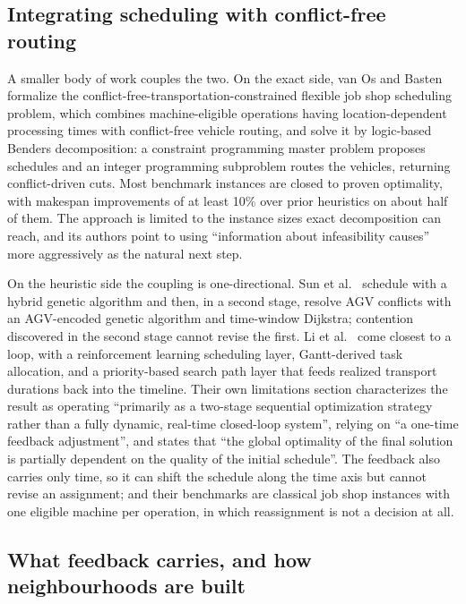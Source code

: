 \documentclass[manuscript,screen,review]{acmart}
\begin{document}
\subsection{Integrating scheduling with conflict-free routing}

A smaller body of work couples the two. On the exact side, van Os and
Basten~\cite{vanos2026exact} formalize the
conflict-free-transportation-constrained flexible job shop scheduling problem,
which combines machine-eligible operations having location-dependent processing
times with conflict-free vehicle routing, and solve it by logic-based Benders
decomposition: a constraint programming master problem proposes schedules and an
integer programming subproblem routes the vehicles, returning conflict-driven
cuts. Most benchmark instances are closed to proven optimality, with makespan
improvements of at least 10\% over prior heuristics on about half of them. The
approach is limited to the instance sizes exact decomposition can reach, and its
authors point to using ``information about infeasibility causes'' more
aggressively as the natural next step.

On the heuristic side the coupling is one-directional. Sun et
al.~\cite{sun2023integrated} schedule with a hybrid genetic algorithm and then,
in a second stage, resolve AGV conflicts with an AGV-encoded genetic algorithm
and time-window Dijkstra; contention discovered in the second stage cannot revise
the first. Li et al.~\cite{li2026framework} come closest to a loop, with a
reinforcement learning scheduling layer, Gantt-derived task allocation, and a
priority-based search path layer that feeds realized transport durations back
into the timeline. Their own limitations section characterizes the result as
operating ``primarily as a two-stage sequential optimization strategy rather than
a fully dynamic, real-time closed-loop system'', relying on ``a one-time feedback
adjustment'', and states that ``the global optimality of the final solution is
partially dependent on the quality of the initial schedule''. The feedback also
carries only time, so it can shift the schedule
along the time axis but cannot revise an assignment; and their benchmarks are
classical job shop instances with one eligible machine per operation, in which
reassignment is not a decision at all.

\subsection{What feedback carries, and how neighbourhoods are built}
\end{document}
